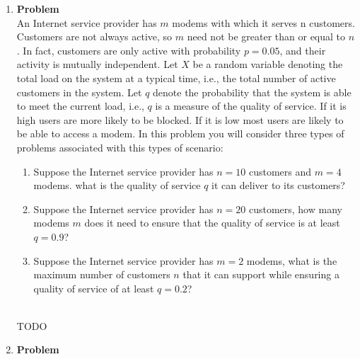 \documentclass[12pt]{article}
\newenvironment{Ex}{\textbf{Problem}\vspace{.75em}\\}{}
\begin{document}
\begin{enumerate}
\begin{Ex}
      You toss independently a fair coin and you count the number of
      tosses until the first tail appears. If this number is n, you
      receive 2n dollars. What is the expected amount that you will
      receive? How much would you be willing to pay to play this game?
      \begin{solution} \hfill \\
        {\huge TODO}
      \end{solution}
    \end{Ex}
  \item 
    \begin{Ex}
      An Internet service provider has $m$ modems with which it serves
      n customers. Customers are not always active, so $m$ need not be
      greater than or equal to $n$. In fact, customers are only active
      with probability $p = 0.05$, and their activity is mutually
      independent. Let $X$ be a random variable denoting the total
      load on the system at a typical time, i.e., the total number of
      active customers in the system. Let $q$ denote the probability
      that the system is able to meet the current load, i.e., $q$ is a
      measure of the quality of service. If it is high users are more
      likely to be blocked. If it is low most users are likely to be
      able to access a modem. In this problem you will consider three
      types of problems associated with this types of scenario:
      \begin{enumerate}
      \item Suppose the Internet service provider has $n = 10$
        customers and $m = 4$ modems. what is the quality of service
        $q$ it can deliver to its customers?
      \item Suppose the Internet service provider has $n = 20$
        customers, how many modems $m$ does it need to ensure that the
        quality of service is at least $q = 0.9$?
      \item Suppose the Internet service provider has $m = 2$ modems,
        what is the maximum number of customers $n$ that it can support
        while ensuring a quality of service of at least $q = 0.2$?
      \end{enumerate}
      \begin{solution} \hfill \\
        {\huge TODO}
      \end{solution}
    \end{Ex}
  \item 
    \begin{Ex}

\end{Ex}
\end{enumerate}
\end{document}
